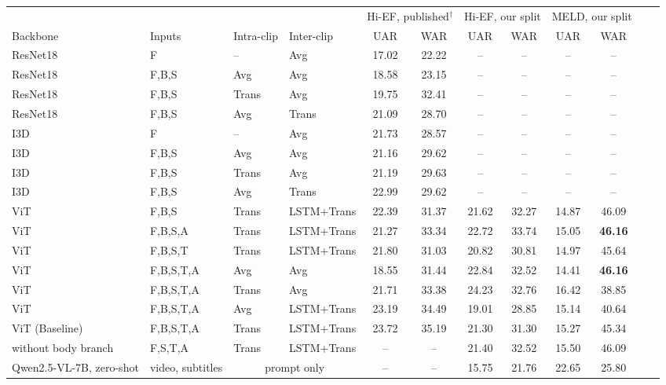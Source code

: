 \documentclass[11pt]{article}
\begin{document}
\begin{table}[t]
\centering\small
\setlength{\tabcolsep}{2.6pt}
\begin{tabular}{lll@{\hspace{9pt}}l@{\hspace{9pt}}cccccccc}
\toprule
 & & & & \multicolumn{2}{c}{Hi-EF, published$^\dagger$} & \multicolumn{2}{c}{Hi-EF, our split} & \multicolumn{2}{c}{MELD, our split} \\
\cmidrule(lr){5-6}\cmidrule(lr){7-8}\cmidrule(lr){9-10}
Backbone & Inputs & Intra-clip & Inter-clip & UAR & WAR & UAR & WAR & UAR & WAR \\
\midrule
ResNet18 & F & -- & Avg & 17.02 & 22.22 & -- & -- & -- & -- \\
ResNet18 & F,B,S & Avg & Avg & 18.58 & 23.15 & -- & -- & -- & -- \\
ResNet18 & F,B,S & Trans & Avg & 19.75 & 32.41 & -- & -- & -- & -- \\
ResNet18 & F,B,S & Avg & Trans & 21.09 & 28.70 & -- & -- & -- & -- \\
I3D & F & -- & Avg & 21.73 & 28.57 & -- & -- & -- & -- \\
I3D & F,B,S & Avg & Avg & 21.16 & 29.62 & -- & -- & -- & -- \\
I3D & F,B,S & Trans & Avg & 21.19 & 29.63 & -- & -- & -- & -- \\
I3D & F,B,S & Avg & Trans & 22.99 & 29.62 & -- & -- & -- & -- \\
\midrule
ViT & F,B,S & Trans & LSTM+Trans & 22.39 & 31.37 & 21.62 & 32.27 & 14.87 & 46.09 \\
ViT & F,B,S,A & Trans & LSTM+Trans & 21.27 & 33.34 & 22.72 & 33.74 & 15.05 & \textbf{46.16} \\
ViT & F,B,S,T & Trans & LSTM+Trans & 21.80 & 31.03 & 20.82 & 30.81 & 14.97 & 45.64 \\
ViT & F,B,S,T,A & Avg & Avg & 18.55 & 31.44 & 22.84 & 32.52 & 14.41 & \textbf{46.16} \\
ViT & F,B,S,T,A & Trans & Avg & 21.71 & 33.38 & 24.23 & 32.76 & 16.42 & 38.85 \\
ViT & F,B,S,T,A & Avg & LSTM+Trans & 23.19 & 34.49 & 19.01 & 28.85 & 15.14 & 40.64 \\
ViT (Baseline) & F,B,S,T,A & Trans & LSTM+Trans & 23.72 & 35.19 & 21.30 & 31.30 & 15.27 & 45.34 \\
\quad without body branch & F,S,T,A & Trans & LSTM+Trans & -- & -- & 21.40 & 32.52 & 15.50 & 46.09 \\
\midrule
Qwen2.5-VL-7B, zero-shot & video, subtitles & \multicolumn{2}{c}{prompt only} & -- & -- & 15.75 & 21.76 & 22.65 & 25.80 \\

\end{tabular}
\end{table}
\end{document}
